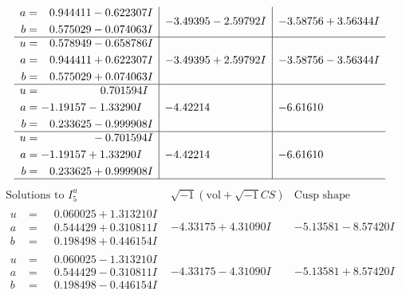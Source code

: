 \documentclass[1p]{elsarticle_modified}
\theoremstyle{definition}
\newcommand{\I}{\sqrt{-1}}
\begin{document}
$$\begin{array}{c|c|c}
\begin{aligned}
a &= \phantom{-}0.944411 - 0.622307 I \\
b &= \phantom{-}0.575029 - 0.074063 I\end{aligned}
 & -3.49395 - 2.59792 I & -3.58756 + 3.56344 I \\ \hline\begin{aligned}
u &= \phantom{-}0.578949 - 0.658786 I \\
a &= \phantom{-}0.944411 + 0.622307 I \\
b &= \phantom{-}0.575029 + 0.074063 I\end{aligned}
 & -3.49395 + 2.59792 I & -3.58756 - 3.56344 I \\ \hline\begin{aligned}
u &= \phantom{-0.000000 -}0.701594 I \\
a &= -1.19157 - 1.33290 I \\
b &= \phantom{-}0.233625 - 0.999908 I\end{aligned}
 & -4.42214\phantom{ +0.000000I} & -6.61610\phantom{ +0.000000I} \\ \hline\begin{aligned}
u &= \phantom{-0.000000 } -0.701594 I \\
a &= -1.19157 + 1.33290 I \\
b &= \phantom{-}0.233625 + 0.999908 I\end{aligned}
 & -4.42214\phantom{ +0.000000I} & -6.61610\phantom{ +0.000000I}\\
 \hline 
 \end{array}$$\newpage$$\begin{array}{c|c|c}  
\text{Solutions to }I^u_{5}& \I (\text{vol} + \sqrt{-1}CS) & \text{Cusp shape}\\
 \hline 
\begin{aligned}
u &= \phantom{-}0.060025 + 1.313210 I \\
a &= \phantom{-}0.544429 + 0.310811 I \\
b &= \phantom{-}0.198498 + 0.446154 I\end{aligned}
 & -4.33175 + 4.31090 I & -5.13581 - 8.57420 I \\ \hline\begin{aligned}
u &= \phantom{-}0.060025 - 1.313210 I \\
a &= \phantom{-}0.544429 - 0.310811 I \\
b &= \phantom{-}0.198498 - 0.446154 I\end{aligned}
 & -4.33175 - 4.31090 I & -5.13581 + 8.57420 I \\ \hline\begin{aligned}

\end{aligned}
\end{array}$$
\end{document}
